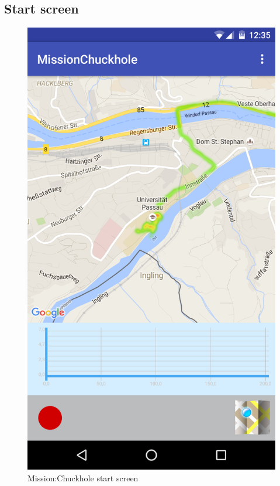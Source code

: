 \documentclass[10pt,a4paper]{article} %
\begin{document}
	\subsection{Start screen}
		
		\begin{figure}[H]
		\begin{center}
 		  \includegraphics[scale=0.1]{img/startscreen.png}
		  \caption{Mission:Chuckhole start screen}
		  \label{fig:startscreen}
		\end{center}
		\end{figure}
\end{document}
